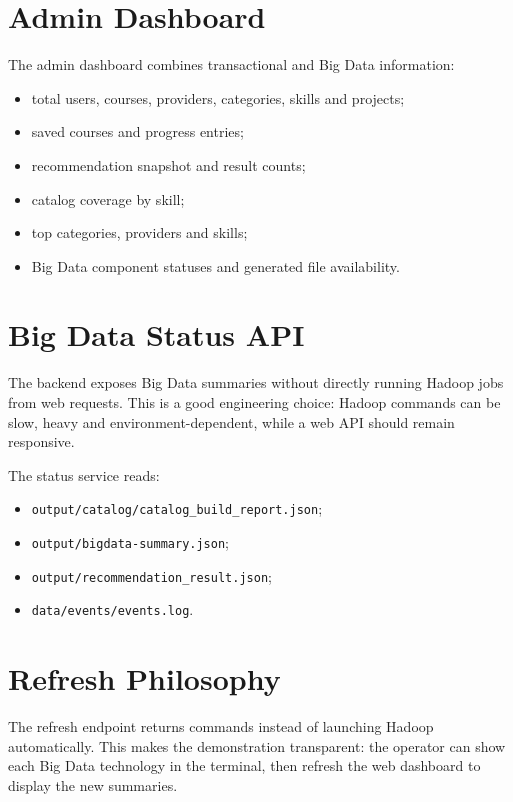 \documentclass[12pt,a4paper]{report}
\begin{document}
\section{Admin Dashboard}
The admin dashboard combines transactional and Big Data information:

\begin{itemize}[leftmargin=*]
    \item total users, courses, providers, categories, skills and projects;
    \item saved courses and progress entries;
    \item recommendation snapshot and result counts;
    \item catalog coverage by skill;
    \item top categories, providers and skills;
    \item Big Data component statuses and generated file availability.
\end{itemize}

\section{Big Data Status API}
The backend exposes Big Data summaries without directly running Hadoop jobs from web requests. This is a good engineering choice: Hadoop commands can be slow, heavy and environment-dependent, while a web API should remain responsive.

The status service reads:
\begin{itemize}[leftmargin=*]
    \item \texttt{output/catalog/catalog\_build\_report.json};
    \item \texttt{output/bigdata-summary.json};
    \item \texttt{output/recommendation\_result.json};
    \item \texttt{data/events/events.log}.
\end{itemize}

\section{Refresh Philosophy}
The refresh endpoint returns commands instead of launching Hadoop automatically. This makes the demonstration transparent: the operator can show each Big Data technology in the terminal, then refresh the web dashboard to display the new summaries.

\end{document}
